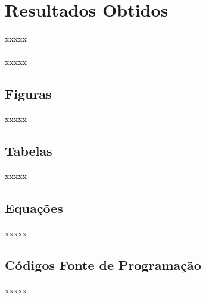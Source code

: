 \chapter{Resultados Obtidos}
\label{Cap:Resultados}
\newcommand{\EscalaAlgumaCoisa}{0.6}


xxxxx
\\\\
xxxxx 

\section{Figuras}

xxxxx


\section{Tabelas}

xxxxx

\section{Equações}

xxxxx

\section{Códigos Fonte de Programação}

xxxxx

